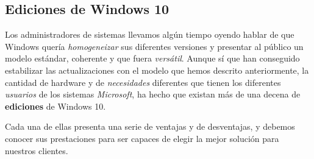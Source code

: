 \documentclass[11pt]{article}
\begin{document}
\subsection{Ediciones de Windows 10}
\label{sec:org946b9e3}

Los administradores de sistemas llevamos algún tiempo oyendo hablar de que Windows
quería \emph{homogeneizar} sus diferentes versiones y presentar al público un modelo estándar,
coherente y que fuera \emph{versátil}. Aunque sí que han conseguido estabilizar las actualizaciones
con el modelo que hemos descrito anteriormente, la cantidad de hardware y de \emph{necesidades} diferentes
que tienen los diferentes \emph{usuarios} de los sistemas \emph{Microsoft}, ha hecho que existan más de una decena 
de \textbf{ediciones} de Windows 10.

Cada una de ellas presenta una serie de ventajas y de desventajas, y debemos conocer 
sus prestaciones para ser capaces de elegir la mejor solución para nuestros clientes.
\end{document}
